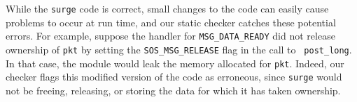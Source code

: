 While the {\tt surge} code is correct, small changes to the code can
easily cause problems to occur at run time, and our static checker
catches these potential errors.  For example, suppose the handler for
{\tt MSG\_DATA\_READY} did not release ownership of {\tt pkt} by
setting the {\tt SOS\_MSG\_RELEASE} flag in the call to {\tt
post\_long}.  In that case, the module would leak the memory allocated
for {\tt pkt}.  Indeed, our checker flags this modified version of the
code as erroneous, since {\tt surge} would not be freeing, releasing,
or storing the data for which it has taken ownership.




% 

